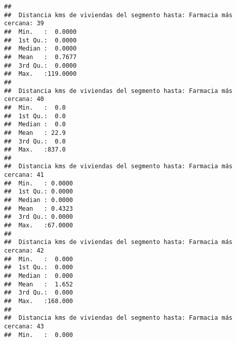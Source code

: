 \documentclass[11pt,]{article}
\begin{document}
\begin{verbatim}
##                                                                         
##  Distancia kms de viviendas del segmento hasta: Farmacia más cercana: 39
##  Min.   :  0.0000                                                       
##  1st Qu.:  0.0000                                                       
##  Median :  0.0000                                                       
##  Mean   :  0.7677                                                       
##  3rd Qu.:  0.0000                                                       
##  Max.   :119.0000                                                       
##                                                                         
##  Distancia kms de viviendas del segmento hasta: Farmacia más cercana: 40
##  Min.   :  0.0                                                          
##  1st Qu.:  0.0                                                          
##  Median :  0.0                                                          
##  Mean   : 22.9                                                          
##  3rd Qu.:  0.0                                                          
##  Max.   :837.0                                                          
##                                                                         
##  Distancia kms de viviendas del segmento hasta: Farmacia más cercana: 41
##  Min.   : 0.0000                                                        
##  1st Qu.: 0.0000                                                        
##  Median : 0.0000                                                        
##  Mean   : 0.4323                                                        
##  3rd Qu.: 0.0000                                                        
##  Max.   :67.0000                                                        
##                                                                         
##  Distancia kms de viviendas del segmento hasta: Farmacia más cercana: 42
##  Min.   :  0.000                                                        
##  1st Qu.:  0.000                                                        
##  Median :  0.000                                                        
##  Mean   :  1.652                                                        
##  3rd Qu.:  0.000                                                        
##  Max.   :168.000                                                        
##                                                                         
##  Distancia kms de viviendas del segmento hasta: Farmacia más cercana: 43
##  Min.   :  0.000                                                        

\end{verbatim}
\end{document}
